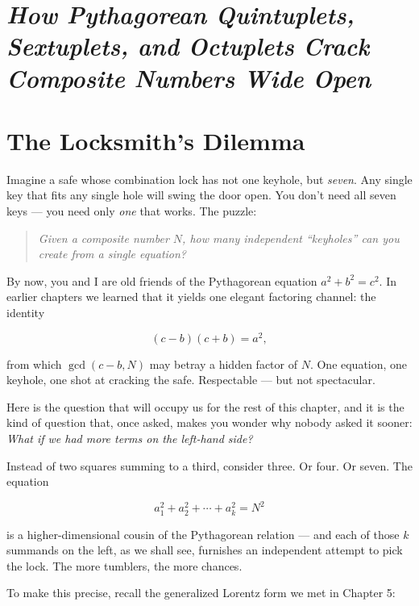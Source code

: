 \section{\texorpdfstring{\emph{How Pythagorean Quintuplets, Sextuplets, and Octuplets Crack Composite Numbers Wide Open}}{How Pythagorean Quintuplets, Sextuplets, and Octuplets Crack Composite Numbers Wide Open}}\label{ch6-how-pythagorean-quintuplets-sextuplets-and-octuplets-crack-composite-numbers-wide-open}



\section{The Locksmith's Dilemma}\label{ch6-the-locksmiths-dilemma}

Imagine a safe whose combination lock has not one keyhole, but \emph{seven}. Any single key that fits any single hole will swing the door open. You don't need all seven keys --- you need only \emph{one} that works. The puzzle:

\begin{quote}
\emph{Given a composite number \(N\), how many independent ``keyholes'' can you create from a single equation?}
\end{quote}

By now, you and I are old friends of the Pythagorean equation \(a^2 + b^2 = c^2\). In earlier chapters we learned that it yields one elegant factoring channel: the identity

\[(c - b)(c + b) = a^2,\]

from which \(\gcd(c - b, N)\) may betray a hidden factor of \(N\). One equation, one keyhole, one shot at cracking the safe. Respectable --- but not spectacular.

Here is the question that will occupy us for the rest of this chapter, and it is the kind of question that, once asked, makes you wonder why nobody asked it sooner: \emph{What if we had more terms on the left-hand side?}

Instead of two squares summing to a third, consider three. Or four. Or seven. The equation

\[a_1^2 + a_2^2 + \cdots + a_k^2 = N^2\]

is a higher-dimensional cousin of the Pythagorean relation --- and each of those \(k\) summands on the left, as we shall see, furnishes an independent attempt to pick the lock. The more tumblers, the more chances.

To make this precise, recall the generalized Lorentz form we met in Chapter 5:

